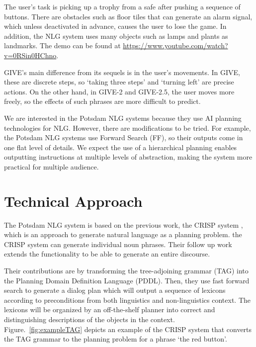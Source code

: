 \documentclass[11pt]{article} %
\begin{document}
The user's task is picking up a trophy from a safe after pushing a sequence of buttons.
There are obstacles such as floor tiles that can generate an alarm signal,
which unless deactivated in advance, causes the user to lose the game.
In addition, the NLG system uses many objects such as lamps and plants as landmarks.
The demo can be found at \url{https://www.youtube.com/watch?v=0RSin0HChno}.

GIVE's main difference from its sequels is in the user's movements.
In GIVE, these are discrete steps, so `taking three steps' and `turning left' are precise actions.
On the other hand, in GIVE-2 and GIVE-2.5, the user moves more freely,
so the effects of such phrases are more difficult to predict.

We are interested in the Potsdam NLG systems \cite{garoufi2011potsdam}
because they use AI planning technologies for NLG.
However, there are modifications to be tried.
For example, the Potsdam NLG systems use Forward Search (FF),
so their outputs come in one flat level of details.
We expect the use of a hierarchical planning enables outputting instructions
at multiple levels of abstraction, making the system more practical
for multiple audience.

\section{Technical Approach}


The Potsdam NLG system \cite{garoufi2011combining, garoufi2011potsdam, garoufi2014generation} is based on the previous work, the CRISP system \cite{crisp07}, which is an approach to generate natural language as a planning problem. the CRISP system can generate individual noun phrases. Their follow up work \cite{scrisp-10} extends the functionality to be able to generate an entire discourse.

Their contributions are by transforming the tree-adjoining grammar (TAG) into the Planning Domain Definition Language (PDDL). Then, they use fast forward search \cite{hoffmann:nebel:jair-01} to generate a dialog plan which will output a sequence of lexicons according to preconditions from both linguistics and non-linguistics context. The lexicons will be organized by an off-the-shelf planner into correct and distinguishing descriptions of the objects in the context. Figure.~\ref{fig:exampleTAG} depicts an example of the CRISP system that converts the TAG grammar to the planning problem for a phrase `the red button'.
\end{document}
